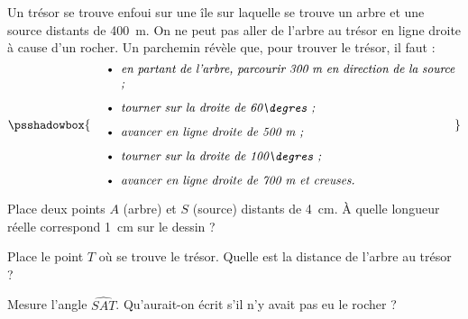 Un trésor se trouve enfoui sur une île sur laquelle se trouve un arbre
et une source distants de 400~m. On ne peut pas aller de l'arbre au
trésor en ligne droite à cause d'un rocher. Un parchemin révèle que,
pour trouver le trésor, il faut :
\[
\psshadowbox{
\begin{minipage}{300pt}
\begin{itemize}
\item{\em en partant de l'arbre, parcourir 300~\mbox{m} en direction de la
source ;}
\item{\em tourner sur la droite de 60\degres ;}
\item{\em avancer en ligne droite de 500~\mbox{m} ;}
\item{\em tourner sur la droite de 100\degres ;}
\item{\em avancer en ligne droite de 700~\mbox{m} et creuses.}
\end{itemize}
\end{minipage}
}
\]
\begin{myenumerate}
\item Place deux points $A$ (arbre) et $S$ (source) distants de
4~cm. \`A quelle longueur réelle correspond 1~cm sur le dessin ?
\item Place le point $T$ où se trouve le trésor. Quelle est la
distance de l'arbre au trésor ?
\item Mesure l'angle $\widehat{SAT}$. Qu'aurait-on écrit s'il n'y
avait pas eu le rocher ?
\end{myenumerate}